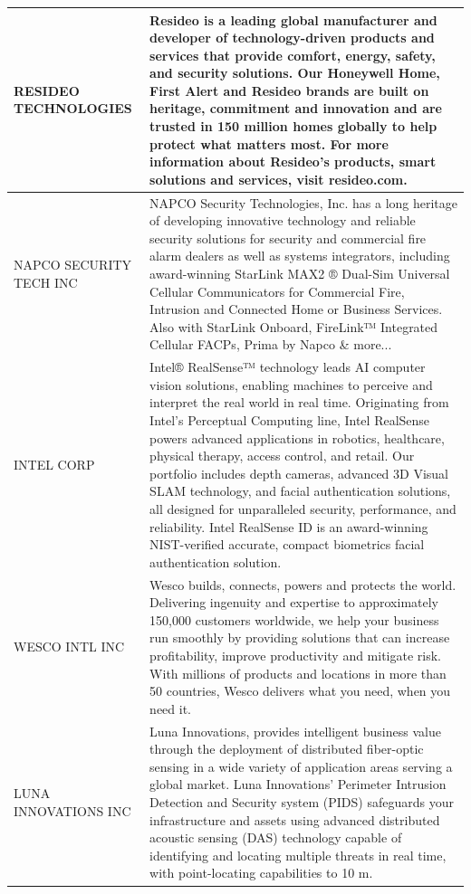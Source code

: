 \begin{tabular}{>{\raggedright\arraybackslash}p{3.5cm}>{\raggedright\arraybackslash}p{20cm}}
   \midrule
RESIDEO TECHNOLOGIES & Resideo is a leading global manufacturer and developer of technology-driven products and services that provide comfort, energy, safety, and security solutions. Our Honeywell Home, First Alert and Resideo brands are built on heritage, commitment and innovation and are trusted in 150 million homes globally to help protect what matters most. For more information about Resideo’s products, smart solutions and services, visit resideo.com. \\ 
   \midrule
NAPCO SECURITY TECH INC & NAPCO Security Technologies, Inc. has a long heritage of developing innovative technology and reliable security solutions for security and commercial fire alarm dealers as well as systems integrators, including award-winning StarLink MAX2 ® Dual-Sim Universal Cellular Communicators for Commercial Fire, Intrusion and Connected Home or Business Services. Also with StarLink Onboard, FireLink™ Integrated Cellular FACPs, Prima by Napco \& more... \\ 
   \midrule
INTEL CORP & Intel® RealSense™ technology leads AI computer vision solutions, enabling machines to perceive and interpret the real world in real time. Originating from Intel's Perceptual Computing line, Intel RealSense powers advanced applications in robotics, healthcare, physical therapy, access control, and retail. Our portfolio includes depth cameras, advanced 3D Visual SLAM technology, and facial authentication solutions, all designed for unparalleled security, performance, and reliability. Intel RealSense ID is an award-winning NIST-verified accurate, compact biometrics facial authentication solution. \\ 
   \midrule
WESCO INTL INC & Wesco builds, connects, powers and protects the world. Delivering ingenuity and expertise to approximately 150,000 customers worldwide, we help your business run smoothly by providing solutions that can increase profitability, improve productivity and mitigate risk. With millions of products and locations in more than 50 countries, Wesco delivers what you need, when you need it. \\ 
   \midrule
LUNA INNOVATIONS INC & Luna Innovations, provides intelligent business value through the deployment of distributed fiber-optic sensing in a wide variety of application areas serving a global market. Luna Innovations' Perimeter Intrusion Detection and Security system (PIDS) safeguards your infrastructure and assets using advanced distributed acoustic sensing (DAS) technology capable of identifying and locating multiple threats in real time, with point-locating capabilities to 10 m. \\ 
   \bottomrule
\end{tabular}
